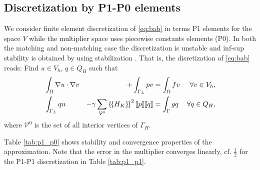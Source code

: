 \documentclass[r]{siamart171218}
\begin{document}
\subsection{Discretization by P1-P0 elements}\label{sec:p1_p0}
We consider finite element discretization of \eqref{eq:bab} in terms P1 elements
for the space $V$ while the multiplier space uses piecewise constants elements
(P0). In both the matching and non-matching case the discretization is unstable
and inf-sup stability is obtained by using stabilization \cite{burman2014projection}.
That is, the disretization of \eqref{eq:bab} reads: Find $u\in V_h$, $q\in Q_H$ such that
%
\begin{equation}\label{eq:p0_stab}
\begin{aligned}
&\int_{\Omega} \nabla u\cdot \nabla v &+ \int_{\Gamma_L}p v &= \int_{\Omega} f v &\forall v\in V_h,\\
  &\int_{\Gamma_L}q u  &-\gamma \sum_{\mathcal{V}^0} \avg{H_K}^2\jump{p}\jump{q} &= \int_{\Gamma} g q &\forall q\in Q_H,
  \end{aligned}
\end{equation}
%
where $\mathcal{V}^0$ is the set of all interior vertices of $\Gamma_H$.

Table \ref{tab:p1_p0} shows stability and convergence properties of the approximation.
Note that the error in the multiplier converges linearly, cf. $\tfrac{1}{2}$ for
the P1-P1 discretization in Table \ref{tab:p1_p1}.
\end{document}
